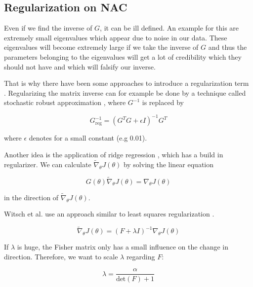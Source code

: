 \subsection{Regularization on NAC}
	Even if we find the inverse of $G$, it can be ill defined. An example for this are extremely small eigenvalues which appear due to noise in our data. These eigenvalues will become extremely large if we take the inverse of $G$ and thus the parameters belonging to the eigenvalues will get a lot of credibility which they should not have and which will falsify our inverse.
	
	That is why there have been some approaches to introduce a regularization term \cite{sohl2012natural}. Regularizing the matrix inverse can for example be done by a technique called stochastic robust approximation \cite{boyd2004convex}, where $G^{-1}$ is replaced by 
	
	\begin{equation}
		G^{-1}_{\text{reg}} = \left( G^T G + \epsilon I \right)^{-1} G^T
	\end{equation}
	
	\noindent where $\epsilon$ denotes for a small constant (e.g 0.01).
	
	Another idea is the application of ridge regression \cite{hoerl1970ridge}, which has a build in regularizer. We can calculate $\widetilde{\nabla}_{\theta} J(\theta)$ by solving the linear equation
	
	\begin{equation}
		G(\theta) \widetilde{\nabla}_{\theta} J(\theta) = \nabla_{\theta} J(\theta)
	\end{equation}
	
	\noindent in the direction of $\widetilde{\nabla}_{\theta} J(\theta)$.
	
	Witsch et al. use an approach similar to least squares regularization \cite{witsch2011enhancing}. 
	
	\begin{equation}
		\widetilde{\nabla}_{\theta} J(\theta) = \left( F + \lambda I \right)^{-1} \nabla_\theta J(\theta)
	\end{equation}
	
	\noindent If $\lambda$ is huge, the Fisher matrix only has a small influence on the change in direction. Therefore, we want to scale $\lambda$ regarding $F$:
	
	\begin{equation}
		\lambda = \dfrac{\alpha}{\text{det}(F) + 1}
	\end{equation}

